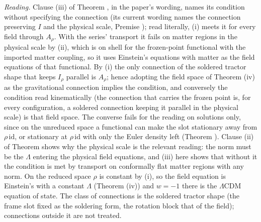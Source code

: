 \emph{Reading.} Clause (iii) of Theorem , in the paper's wording, names its condition without specifying the connection (its current wording names the connection preserving $I$ and the physical scale, Premise ); read literally, (i) meets it for every field through $A_{\rho}$. With the series' transport it fails on matter regions in the physical scale by (ii), which is on shell for the frozen-point functional with the imported matter coupling, so it uses Einstein's equations with matter as the field equations of that functional. By (i) the only connection of the soldered tractor shape that keeps $I_{\rho}$ parallel is $A_{\rho}$; hence adopting the field space of Theorem (iv) as the gravitational connection implies the condition, and conversely the condition read kinematically (the connection that carries the frozen point is, for every configuration, a soldered connection keeping it parallel in the physical scale) is that field space. The converse fails for the reading on solutions only, since on the unreduced space a functional can make the slot stationary away from $\rho\,\mathrm{id}$, or stationary at $\rho\,\mathrm{id}$ with only the Euler density left (Theorem ). Clause (ii) of Theorem  shows why the physical scale is the relevant reading: the norm must be the $\Lambda$ entering the physical field equations, and (iii) here shows that without it the condition is met by transport on conformally flat matter regions with any norm. On the reduced space $\rho$ is constant by (i), so the field equation is Einstein's with a constant $\Lambda$ (Theorem (iv)) and $w = -1$ there is the $\Lambda$CDM equation of state. The class of connections is the soldered tractor shape (the frame slot fixed as the soldering form, the rotation block that of the field); connections outside it are not treated.

